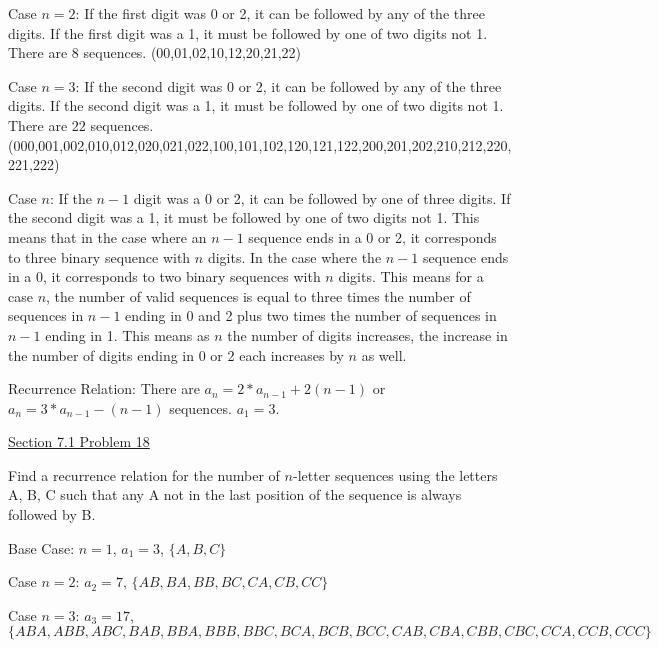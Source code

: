 \documentclass{article}
\begin{document}
Case $n=2$: If the first digit was 0 or 2, it can be followed by any of the three digits. If the first digit was a 1, it must be followed by one of two digits not 1. There are $8$ sequences. (00,01,02,10,12,20,21,22)\newline{}

Case $n=3$: If the second digit was 0 or 2, it can be followed by any of the three digits. If the second digit was a 1, it must be followed by one of two digits not 1. There are $22$ sequences. (000,001,002,010,012,020,021,022,100,101,102,120,121,122,200,201,202,210,212,220,221,222)\newline{}
  
  Case $n$: If the $n-1$ digit was a 0 or 2, it can be followed by one of three digits. If the second digit was a 1, it must be followed by one of two digits not 1.\newline{}
  This means that in the case where an $n-1$ sequence ends in a 0 or 2, it corresponds to three binary sequence with $n$ digits. In the case where the $n-1$ sequence ends in a 0, it corresponds to two binary sequences with $n$ digits. This means for a case $n$, the number of valid sequences is equal to three times the number of sequences in $n-1$ ending in 0 and 2 plus two times the number of sequences in $n-1$ ending in 1. This means as $n$ the number of digits increases, the increase in the number of digits ending in 0 or 2 each increases by $n$ as well.\newline{}

Recurrence Relation: There are $a_n=2*a_{n-1}+2(n-1)$ or $a_n=3*a_{n-1}-(n-1)$ sequences. $a_1=3$.\newline{}


\underline{Section 7.1 Problem 18}\newline{}

Find a recurrence relation for the number of $n$-letter sequences using the letters A, B, C such that any A not in the last position of the sequence is always followed by B.\newline{}

Base Case: $n=1$, $a_1=3$, $\{A,B,C\}$\newline{}

Case $n=2$: $a_2=7$, $\{AB,BA,BB,BC,CA,CB,CC\}$\newline{}

Case $n=3$: $a_3=17$, $\{ABA,ABB,ABC,BAB,BBA,BBB,BBC,BCA,BCB,BCC,CAB,CBA,CBB,CBC,CCA,CCB,CCC\}$\newline{}
\end{document}
